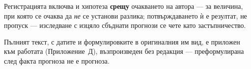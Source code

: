 Регистрацията включва и хипотеза \textbf{срещу} очакването на автора --- за величина,
при която се очаква да \emph{не} се установи разлика; потвърждаването ѝ е резултат, не
пропуск --- изследване с изцяло сбъднати прогнози се чете като застъпничество.

Пълният текст, с датите и формулировките в оригиналния им вид, е приложен към работата
(Приложение~Д), възпроизведен без редакция --- преформулирана след факта прогноза не е
прогноза.
